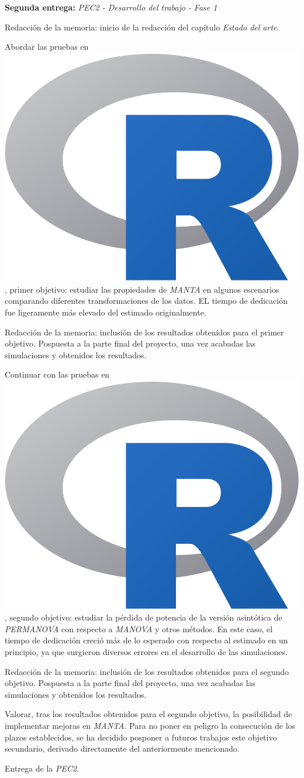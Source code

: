 \documentclass[IB,BIB]{TFUOC}%
\newcommand{\checkbox}{\text{\fboxsep=-.15pt\fbox{\rule{0pt}{1.5ex}\rule{1.5ex}{0pt}}}} %
\newcommand{\cmark}{\ding{51}} %
\newcommand{\xmark}{\ding{55}} %
\newcommand{\progress}{\ding{46}} %
\newcommand{\done}{\rlap{\checkbox}{\raisebox{1.2pt}{\large\hspace{1pt}\cmark}}
\hspace{-2.5pt}}
\newcommand{\wontfix}{\rlap{\checkbox}{\raisebox{-1.5pt}{\large\hspace{-.75pt}\xmark}}
\hspace{-2.5pt}}
\newcommand{\Rlogo}{\protect\includegraphics[height=2.5ex,keepaspectratio]{Rlogo.png}}
\begin{document}
\begin{todolist}
  \item[\done] \textbf{Segunda entrega:} \textit{PEC2 - Desarrollo del trabajo - Fase 1}
  \begin{todolist}
  \item[\progress] Redacción de la memoria: inicio de la redacción del capítulo \textit{Estado del arte}.
  \item[\done] Abordar las pruebas en \hspace{-.2em}\Rlogo\hspace{+.1em}, primer objetivo: estudiar las propiedades de \textit{MANTA} en algunos escenarios comparando diferentes transformaciones de los datos. EL tiempo de dedicación fue ligeramente más elevado del estimado originalmente.
  \item[\progress] Redacción de la memoria: inclusión de los resultados obtenidos para el primer objetivo. Pospuesta a la parte final del proyecto, una vez acabadas las simulaciones y obtenidos los resultados.
  \item[\done] Continuar con las pruebas en \hspace{-.2em}\Rlogo\hspace{+.1em}, segundo objetivo: estudiar la pérdida de potencia de la versión asintótica de \textit{PERMANOVA} con respecto a \textit{MANOVA} y otros métodos. En este caso, el tiempo de dedicación creció más de lo esperado con respecto al estimado en un principio, ya que surgieron diversos errores en el desarrollo de las simulaciones.
  \item[\progress] Redacción de la memoria: inclusión de los resultados obtenidos para el segundo objetivo. Pospuesta a la parte final del proyecto, una vez acabadas las simulaciones y obtenidos los resultados.
  \item[\wontfix] Valorar, tras los resultados obtenidos para el segundo objetivo, la posibilidad de implementar mejoras en \textit{MANTA}. Para no poner en peligro la consecución de los plazos establecidos, se ha decidido posponer a futuros trabajos este objetivo secundario, derivado directamente del anteriormente mencionado.
  \item[\done] Entrega de la \textit{PEC2}.
  \end{todolist}
\end{todolist}

\newpage
\end{document}
